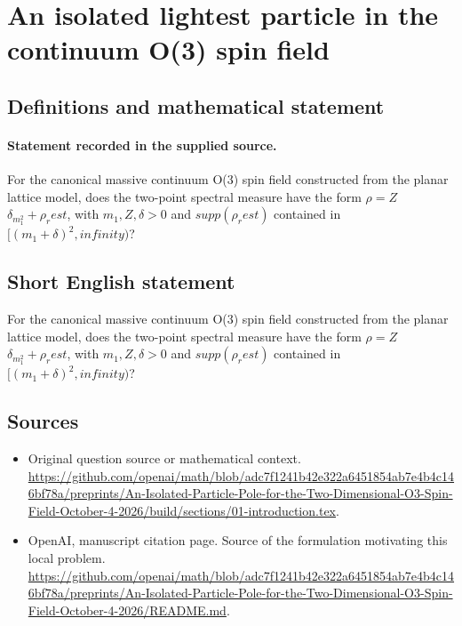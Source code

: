 \documentclass[11pt]{article}
\begin{document}
\section*{An isolated lightest particle in the continuum O(3) spin field}\label{30007378}
\subsection{Definitions and mathematical statement}
\paragraph{Statement recorded in the supplied source.}
For the canonical massive continuum O(3) spin field constructed from the planar lattice model, does the two-point spectral measure have the form $\rho =Z$ $\delta _{m_1^2}+\rho _rest$, with $m_1,Z,\delta >0$ and $supp(\rho _rest)$ contained in $[(m_1+\delta )^2,infinity)$?
\subsection{Short English statement}
For the canonical massive continuum O(3) spin field constructed from the planar lattice model, does the two-point spectral measure have the form $\rho =Z$ $\delta _{m_1^2}+\rho _rest$, with $m_1,Z,\delta >0$ and $supp(\rho _rest)$ contained in $[(m_1+\delta )^2,infinity)$?
\subsection{Sources}
\begin{itemize}
\item[S1] Original question source or mathematical context.
\url{https://github.com/openai/math/blob/adc7f1241b42e322a6451854ab7e4b4c146bf78a/preprints/An-Isolated-Particle-Pole-for-the-Two-Dimensional-O3-Spin-Field-October-4-2026/build/sections/01-introduction.tex}.
\item[S2] OpenAI, manuscript citation page. Source of the formulation motivating this local problem.
\url{https://github.com/openai/math/blob/adc7f1241b42e322a6451854ab7e4b4c146bf78a/preprints/An-Isolated-Particle-Pole-for-the-Two-Dimensional-O3-Spin-Field-October-4-2026/README.md}.
\end{itemize}
\end{document}
